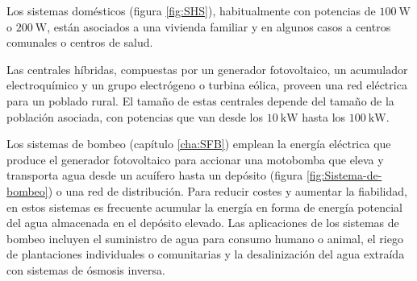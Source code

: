Los sistemas domésticos (figura \ref{fig:SHS}),
habitualmente con potencias de $\SI{100}{\watt}$ o $\SI{200}{\watt}$,
están asociados a una vivienda familiar y en algunos casos a centros
comunales o centros de salud. 

Las centrales híbridas, compuestas por
un generador fotovoltaico, un acumulador electroquímico y un grupo
electrógeno o turbina eólica, proveen una red eléctrica para un poblado
rural. El tamaño de estas centrales depende del tamaño de la población
asociada, con potencias que van desde los $\SI{10}{\kilo\watt}$ hasta
los $\SI{100}{\kilo\watt}$. 

Los sistemas de bombeo (capítulo \ref{cha:SFB})
 emplean la energía eléctrica que produce el generador fotovoltaico
para accionar una motobomba que eleva y transporta agua desde un acuífero
hasta un depósito (figura \ref{fig:Sistema-de-bombeo}) o una red
de distribución. Para reducir costes y aumentar la fiabilidad, en
estos sistemas es frecuente acumular la energía en forma de energía
potencial del agua almacenada en el depósito elevado. Las aplicaciones
de los sistemas de bombeo incluyen el suministro de agua para consumo
humano o animal, el riego de plantaciones individuales o comunitarias
y la desalinización del agua extraída con sistemas de ósmosis inversa.


